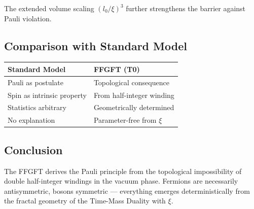 	The extended volume scaling \((l_0 / \xi)^3\) further strengthens the barrier against Pauli violation.
	
	\subsection*{Comparison with Standard Model}
	
	\begin{center}
		\begin{tabular}{p{}p{}}
			\textbf{Standard Model} & \textbf{FFGFT (T0)} \\
			\hline
			Pauli as postulate & Topological consequence \\
			Spin as intrinsic property & From half-integer winding \\
			Statistics arbitrary & Geometrically determined \\
			No explanation & Parameter-free from \(\xi\) \\
		\end{tabular}
	\end{center}
	
	\subsection*{Conclusion}
	
	The FFGFT derives the Pauli principle from the topological impossibility of double half-integer windings in the vacuum phase. Fermions are necessarily antisymmetric, bosons symmetric — everything emerges deterministically from the fractal geometry of the Time-Mass Duality with \(\xi\).



